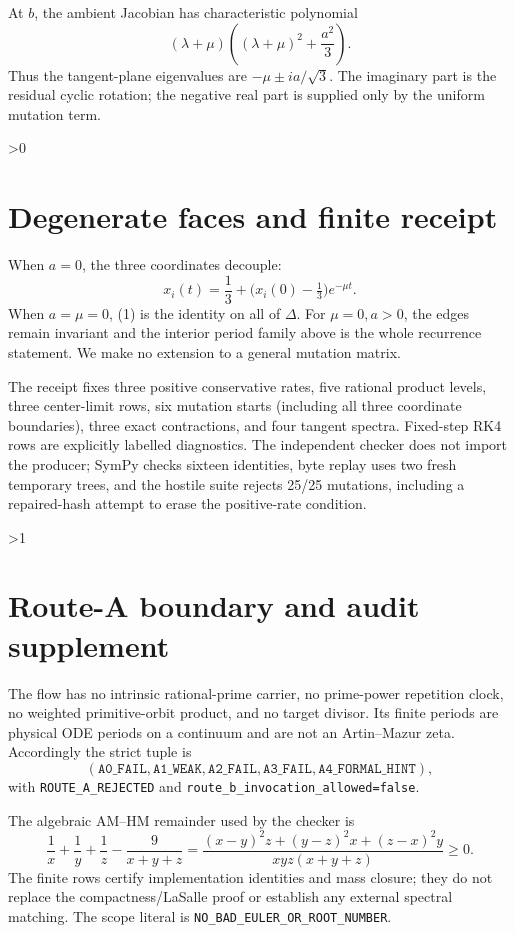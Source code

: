\documentclass[10pt]{article}
\begin{document}
At $b$, the ambient Jacobian has characteristic polynomial
\[
 (\lambda+\mu)\left((\lambda+\mu)^2+\frac{a^2}{3}\right).
\]
Thus the tangent-plane eigenvalues are $-\mu\pm ia/\sqrt3$.  The imaginary
part is the residual cyclic rotation; the negative real part is supplied only
by the uniform mutation term.

\ifnum\CRevisionRound>0
\section{Degenerate faces and finite receipt}
When $a=0$, the three coordinates decouple:
\begin{equation}
 x_i(t)=\frac13+\bigl(x_i(0)-\tfrac13\bigr)e^{-\mu t}. \tag{7}
\end{equation}
When $a=\mu=0$, (1) is the identity on all of $\Delta$.  For $\mu=0,a>0$,
the edges remain invariant and the interior period family above is the whole
recurrence statement.  We make no extension to a general mutation matrix.

The receipt fixes three positive conservative rates, five rational product levels, three
center-limit rows, six mutation starts (including all three coordinate
boundaries), three exact contractions, and four tangent spectra.  Fixed-step
RK4 rows are explicitly labelled diagnostics.  The independent checker does
not import the producer; SymPy checks sixteen identities, byte replay uses two
fresh temporary trees, and the hostile suite rejects 25/25 mutations,
including a repaired-hash attempt to erase the positive-rate condition.
\fi

\ifnum\CRevisionRound>1
\section{Route-A boundary and audit supplement}
The flow has no intrinsic rational-prime carrier, no prime-power repetition
clock, no weighted primitive-orbit product, and no target divisor.  Its finite
periods are physical ODE periods on a continuum and are not an Artin--Mazur
zeta.  Accordingly the strict tuple is
\[
(\mathtt{A0\_FAIL},\mathtt{A1\_WEAK},\mathtt{A2\_FAIL},
 \mathtt{A3\_FAIL},\mathtt{A4\_FORMAL\_HINT}),
\]
with \texttt{ROUTE\_A\_REJECTED} and
\texttt{route\_b\_invocation\_allowed=false}.

The algebraic AM--HM remainder used by the checker is
\[
\frac1x+\frac1y+\frac1z-\frac9{x+y+z}
 =\frac{(x-y)^2z+(y-z)^2x+(z-x)^2y}{xyz(x+y+z)}\ge0.
\]
The finite rows certify implementation identities and mass closure; they do
not replace the compactness/LaSalle proof or establish any external spectral
matching.  The scope literal is
\texttt{NO\_BAD\_EULER\_OR\_ROOT\_NUMBER}.
\fi
\end{document}
